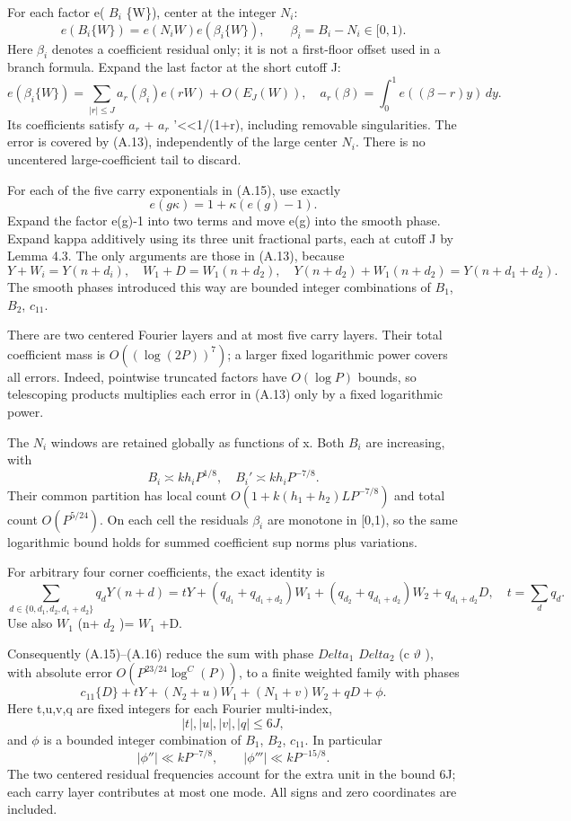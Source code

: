 \documentclass[11pt,a4paper]{article}
\begin{document}
For each factor e( \(B_i\) \{W\}), center at the integer \(N_i\): \[
e(B_i\{W\})=e(N_iW)e(\beta_i\{W\}),\qquad
\beta_i=B_i-N_i\in[0,1).
\] Here \(\beta_i\) denotes a coefficient residual only; it is not a
first-floor offset used in a branch formula. Expand the last factor at
the short cutoff J: \[
e(\beta_i\{W\})=\sum_{|r|\le J}a_r(\beta_i)e(rW)+O(E_J(W)),
\quad a_r(\beta)=\int_0^1e((\beta-r)y)\,dy. \tag{A.16}
\] Its coefficients satisfy \textbar{} \(a_r\) \textbar+\textbar{}
\(a_r\) '\textbar\textless\textless1/(1+\textbar r\textbar), including
removable singularities. The error is covered by (A.13), independently
of the large center \(N_i\). There is no uncentered large-coefficient
tail to discard.

For each of the five carry exponentials in (A.15), use exactly \[
e(g\kappa)=1+\kappa(e(g)-1).
\] Expand the factor e(g)-1 into two terms and move e(g) into the smooth
phase. Expand kappa additively using its three unit fractional parts,
each at cutoff J by Lemma 4.3. The only arguments are those in (A.13),
because \[
Y+W_i=Y(n+d_i),\quad W_1+D=W_1(n+d_2),\quad
Y(n+d_2)+W_1(n+d_2)=Y(n+d_1+d_2).
\] The smooth phases introduced this way are bounded integer
combinations of \(B_1\), \(B_2\), \(c_{11}\).

There are two centered Fourier layers and at most five carry layers.
Their total coefficient mass is \(O((\log(2P))^7)\); a larger fixed
logarithmic power covers all errors. Indeed, pointwise truncated factors
have \(O(\log P)\) bounds, so telescoping products multiplies each error
in (A.13) only by a fixed logarithmic power.

The \(N_i\) windows are retained globally as functions of x. Both
\(B_i\) are increasing, with \[
B_i\asymp kh_iP^{1/8},\quad B_i'\asymp kh_iP^{-7/8}.
\] Their common partition has local count \(O(1+k(h_1+h_2)LP^{-7/8})\)
and total count \(O(P^{5/24})\). On each cell the residuals \(\beta_i\)
are monotone in {[}0,1), so the same logarithmic bound holds for summed
coefficient sup norms plus variations.

For arbitrary four corner coefficients, the exact identity is \[
\sum_{d\in\{0,d_1,d_2,d_1+d_2\}}q_dY(n+d)
=tY+(q_{d_1}+q_{d_1+d_2})W_1
+(q_{d_2}+q_{d_1+d_2})W_2+q_{d_1+d_2}D,
\quad t=\sum_dq_d. \tag{A.17}
\] Use also \(W_1\) (n+ \(d_2\) )= \(W_1\) +D.

Consequently (A.15)--(A.16) reduce the sum with phase \(Delta_1\)
\(Delta_2\) (c \(\vartheta\) ), with absolute error
\(O(P^{23/24} \log^C(P))\), to a finite weighted family with phases \[
c_{11}\{D\}+tY+(N_2+u)W_1+(N_1+v)W_2+qD+\phi . \tag{A.18}
\] Here t,u,v,q are fixed integers for each Fourier multi-index, \[
|t|,|u|,|v|,|q|\le6J,
\] and \(\phi\) is a bounded integer combination of \(B_1\), \(B_2\),
\(c_{11}\). In particular \[
|\phi''|\ll kP^{-7/8},\qquad |\phi'''|\ll kP^{-15/8}. \tag{A.19}
\] The two centered residual frequencies account for the extra unit in
the bound 6J; each carry layer contributes at most one mode. All signs
and zero coordinates are included.
\end{document}
